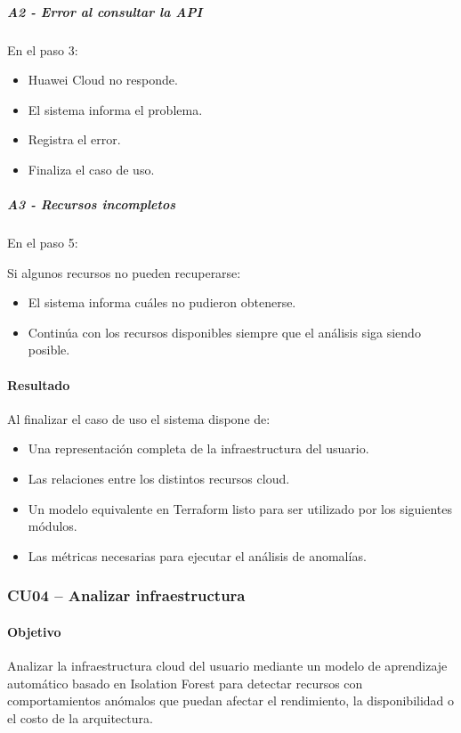 \subparagraph{A2 - Error al consultar la API}

En el paso 3:

\begin{itemize}
\item Huawei Cloud no responde.
\item El sistema informa el problema.
\item Registra el error.
\item Finaliza el caso de uso.
\end{itemize}

\subparagraph{A3 - Recursos incompletos}

En el paso 5:

Si algunos recursos no pueden recuperarse:

\begin{itemize}
\item El sistema informa cuáles no pudieron obtenerse.
\item Continúa con los recursos disponibles siempre que el análisis siga siendo posible.
\end{itemize}

\paragraph*{Resultado}

Al finalizar el caso de uso el sistema dispone de:

\begin{itemize}
\item Una representación completa de la infraestructura del usuario.
\item Las relaciones entre los distintos recursos cloud.
\item Un modelo equivalente en Terraform listo para ser utilizado por los siguientes módulos.
\item Las métricas necesarias para ejecutar el análisis de anomalías.
\end{itemize}

\subsubsection{CU04 -- Analizar infraestructura}

\paragraph*{Objetivo}

Analizar la infraestructura cloud del usuario mediante un modelo de aprendizaje automático basado en Isolation Forest para detectar recursos con comportamientos anómalos que puedan afectar el rendimiento, la disponibilidad o el costo de la arquitectura.

